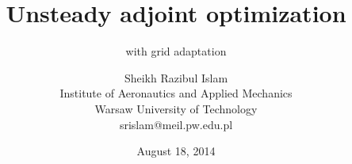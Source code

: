 \title[]
  {Unsteady adjoint optimization}

\subtitle{with grid adaptation}

\author[Part 2]{%
\vspace{5 mm}
  Sheikh Razibul Islam\\
  \vspace{0 mm}
  Institute of Aeronautics and Applied Mechanics\\
  Warsaw University of Technology\\ 
  \vspace{3 mm}
  {srislam}@meil.pw.edu.pl}
  

\date{August 18, 2014}


\frame{\titlepage}

